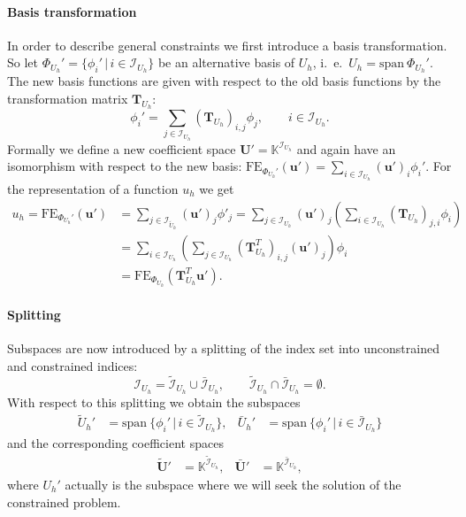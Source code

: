 \paragraph{Basis transformation} In order to describe general
constraints we first introduce a basis transformation. So let
$\Phi_{U_h}'=\{\phi_i'\,|\, i\in \mathcal{I}_{U_h}\}$ be an alternative basis of $U_h$,
i.~e.~$U_h=\text{span}\ \Phi_{U_h}'$. The new basis functions are
given with respect to the old basis functions by the transformation
matrix $\mathbf{T}_{U_h}$:
\begin{equation}
\phi_i' = \sum_{j\in\mathcal{I}_{U_h}}
\left(\mathbf{T}_{U_h}\right)_{i,j} \phi_j, \qquad i\in \mathcal{I}_{U_h}.
\end{equation}
Formally we define a new coefficient space
$\mathbf{U}'=\mathbb{K}^{\mathcal{I}_{U_h}}$ and again have an
isomorphism with respect to the new basis:
$\text{FE}_{\Phi_{U_h}'}(\mathbf{u}') = \sum_{i\in\mathcal{I}_{U_h}}
(\mathbf{u}')_i \phi_i'$. For the representation of a function $u_h$
we get
\begin{equation}
\begin{split}
u_h = \text{FE}_{\Phi_{U_h}'}(\mathbf{u}') &= 
\sum_{j\in\mathcal{I}_{\tilde{U}_h}} (\mathbf{u}')_j \phi'_j = 
\sum_{j\in\mathcal{I}_{U_h}} (\mathbf{u}')_j \left (
\sum_{i\in\mathcal{I}_{U_h}}
\left(\mathbf{T}_{U_h}\right)_{j,i} \phi_i \right)\\
&= \sum_{i\in \mathcal{I}_{U_h}} \left (\sum_{j\in\mathcal{I}_{U_h}}
\left(\mathbf{T}^T_{U_h}\right)_{i,j} (\mathbf{u}')_j \right ) \phi_i\\
&= \text{FE}_{\Phi_{U_h}}\left( \mathbf{T}^T_{U_h} \mathbf{u}' \right) .
\end{split}
\end{equation}

\paragraph{Splitting} Subspaces are now introduced by a splitting of
the index set into unconstrained and constrained indices:
\begin{equation*}
\mathcal{I}_{U_h} = \tilde{\mathcal{I}}_{U_h} \cup
\bar{\mathcal{I}}_{U_h}, \qquad  \tilde{\mathcal{I}}_{U_h} \cap
\bar{\mathcal{I}}_{U_h} = \emptyset.
\end{equation*}
With respect to this splitting we obtain the subspaces
\begin{align*}
\tilde{U}_h' &= \text{span}\ \{\phi_i'\,|\,
i\in\tilde{\mathcal{I}}_{U_h}\}, &
\bar{U}_h' &= \text{span}\ \{\phi_i'\,|\,
i\in\bar{\mathcal{I}}_{U_h}\}
\end{align*}
and the corresponding coefficient spaces
\begin{align*}
\tilde{\mathbf{U}}' &=
\mathbb{K}^{\tilde{\mathcal{I}}_{U_h}}, &
\bar{\mathbf{U}}' &=
\mathbb{K}^{\bar{\mathcal{I}}_{U_h}},
\end{align*}
where $U_h'$ actually is the subspace where we will seek the solution
of the constrained problem.

